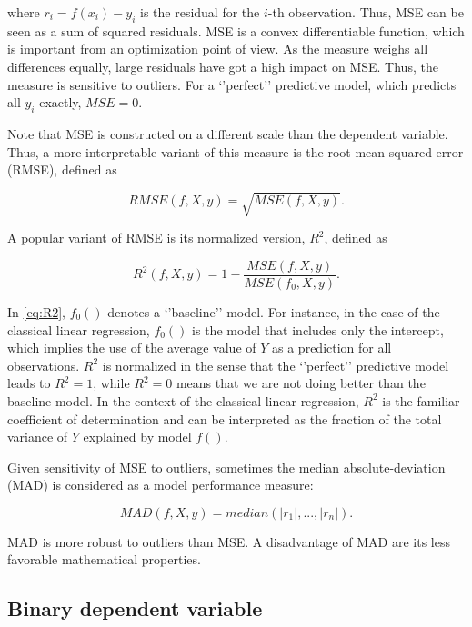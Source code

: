 \documentclass[]{krantz}
\begin{document}
where \(r_i=f(x_i) - y_i\) is the residual for the \(i\)-th observation. Thus, MSE can be seen as a sum of squared residuals. MSE is a convex differentiable function, which is important from an optimization point of view. As the measure weighs all differences equally, large residuals have got a high impact on MSE. Thus, the measure is sensitive to outliers. For a `'perfect'' predictive model, which predicts all \(y_i\) exactly, \(MSE = 0\).

Note that MSE is constructed on a different scale than the dependent variable. Thus, a more interpretable variant of this measure is the root-mean-squared-error (RMSE), defined as

\begin{equation}
RMSE(f, X, y) = \sqrt{MSE(f, X, y)}.
\label{eq:RMSE}
\end{equation}

A popular variant of RMSE is its normalized version, \(R^2\), defined as

\begin{equation}
R^2(f, X, y) = 1 - \frac{MSE(f, X, y)}{MSE(f_0, X,y)}.
\label{eq:R2}
\end{equation}

In \eqref{eq:R2}, \(f_0()\) denotes a `'baseline'' model. For instance, in the case of the classical linear regression, \(f_0()\) is the model that includes only the intercept, which implies the use of the average value of \(Y\) as a prediction for all observations. \(R^2\) is normalized in the sense that the `'perfect'' predictive model leads to \(R^2 = 1\), while \(R^2 = 0\) means that we are not doing better than the baseline model. In the context of the classical linear regression, \(R^2\) is the familiar coefficient of determination and can be interpreted as the fraction of the total variance of \(Y\) explained by model \(f()\).

Given sensitivity of MSE to outliers, sometimes the median absolute-deviation (MAD) is considered as a model performance measure:

\begin{equation}
MAD(f, X ,y) = median( |r_1|, ..., |r_n| ).
\label{eq:MAD}
\end{equation}

MAD is more robust to outliers than MSE. A disadvantage of MAD are its less favorable mathematical properties.

\hypertarget{modelPerformanceMethodBin}{%
\subsection{Binary dependent variable}\label{modelPerformanceMethodBin}}
\end{document}
